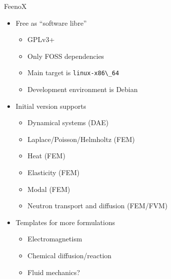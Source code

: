 \documentclass[
  ignorenonframetext,
  aspectratio=169,
]{beamer}
\newcommand{\passthrough}[1]{#1}
\providecommand{\tightlist}{%
  \setlength{\itemsep}{0pt}\setlength{\parskip}{0pt}}
\begin{document}
\begin{frame}[fragile]{}
\begin{columns}[T]
\pause

\begin{column}{0.5\textwidth}
\begin{exampleblock}{FeenoX}
\protect\hypertarget{feenox}{}
\begin{itemize}
\tightlist
\item
  Free as ``software libre''

  \begin{itemize}
  \tightlist
  \item
    GPLv3+
  \item
    Only FOSS dependencies
  \item
    Main target is \passthrough{\lstinline!linux-x86\_64!}
  \item
    Development environment is Debian \medskip
  \end{itemize}
\item
  Initial version supports

  \begin{itemize}
  \tightlist
  \item
    Dynamical systems (DAE)
  \item
    Laplace/Poisson/Helmholtz (FEM)
  \item
    Heat (FEM)
  \item
    Elasticity (FEM)
  \item
    Modal (FEM)
  \item
    Neutron transport and diffusion (FEM/FVM)
  \end{itemize}
\item
  Templates for more formulations

  \begin{itemize}
  \tightlist
  \item
    Electromagnetism
  \item
    Chemical diffusion/reaction
  \item
    Fluid mechanics?
  \end{itemize}
\end{itemize}
\end{exampleblock}
\end{column}
\end{columns}
\end{frame}
\end{document}
